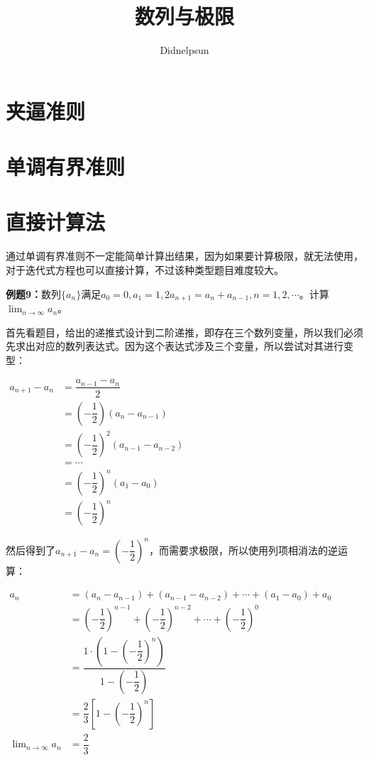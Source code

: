 \documentclass[UTF8]{ctexart}
\author{Didnelpsun}
\title{数列与极限}
\date{}
\begin{document}
\maketitle
\thispagestyle{empty}
\tableofcontents
\thispagestyle{empty}
\newpage
\pagestyle{plain}
\setcounter{page}{1}


\section{夹逼准则}



\section{单调有界准则}



\section{直接计算法}

通过单调有界准则不一定能简单计算出结果，因为如果要计算极限，就无法使用，对于迭代式方程也可以直接计算，不过该种类型题目难度较大。

\textbf{例题9：}数列$\{a_n\}$满足$a_0=0,a_1=1,2a_{n+1}=a_n+a_{n-1},n=1,2,\cdots$。计算$\lim_{n\to\infty}a_n$。

首先看题目，给出的递推式设计到二阶递推，即存在三个数列变量，所以我们必须先求出对应的数列表达式。因为这个表达式涉及三个变量，所以尝试对其进行变型：

$
\begin{aligned}
    a_{n+1}-a_n & =\dfrac{a_{n-1}-a_n}{2} \\
    & =\left(-\dfrac{1}{2}\right)(a_n-a_{n-1}) \\
    & =\left(-\dfrac{1}{2}\right)^2(a_{n-1}-a_{n-2}) \\
    & =\cdots \\
    & =\left(-\dfrac{1}{2}\right)^n(a_1-a_0) \\ 
    & = \left(-\dfrac{1}{2}\right)^n
\end{aligned}
$

然后得到了$a_{n+1}-a_n=\left(-\dfrac{1}{2}\right)^n$，而需要求极限，所以使用列项相消法的逆运算：

$
\begin{aligned}
    a_n & = (a_n-a_{n-1})+(a_{n-1}-a_{n-2})+\cdots+(a_1-a_0)+a_0 \\
     & = \left(-\dfrac{1}{2}\right)^{n-1} + \left(-\dfrac{1}{2}\right)^{n-2} + \cdots + \left(-\dfrac{1}{2}\right)^0 \\
     & = \dfrac{1\cdot\left(1-\left(-\dfrac{1}{2}\right)^n\right)}{1-\left(-\dfrac{1}{2}\right)} \\
     & = \dfrac{2}{3}\left[1-\left(-\dfrac{1}{2}\right)^n\right] \\
    \lim_{n\to\infty}a_n & =\dfrac{2}{3}
\end{aligned}
$
\end{document}
